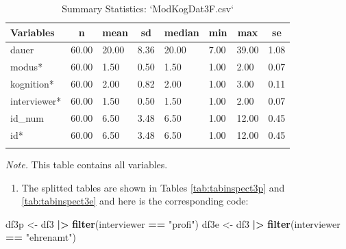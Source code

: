 \documentclass[
  doc,floatsintext]{apa6}
\newenvironment{Shaded}{\begin{snugshade}}{\end{snugshade}}
\newcommand{\FunctionTok}[1]{\textcolor[rgb]{0.13,0.29,0.53}{\textbf{#1}}}
\newcommand{\NormalTok}[1]{#1}
\newcommand{\OtherTok}[1]{\textcolor[rgb]{0.56,0.35,0.01}{#1}}
\newcommand{\SpecialCharTok}[1]{\textcolor[rgb]{0.81,0.36,0.00}{\textbf{#1}}}
\newcommand{\StringTok}[1]{\textcolor[rgb]{0.31,0.60,0.02}{#1}}
\providecommand{\tightlist}{%
  \setlength{\itemsep}{0pt}\setlength{\parskip}{0pt}}
\begin{document}
\begin{table}[tbp]

\begin{center}
\begin{threeparttable}

\caption{\label{tab:tabsumstat3correct}Summary Statistics: `ModKogDat3F.csv`}

\begin{tabular}{llllllll}
\toprule
Variables & \multicolumn{1}{c}{n} & \multicolumn{1}{c}{mean} & \multicolumn{1}{c}{sd} & \multicolumn{1}{c}{median} & \multicolumn{1}{c}{min} & \multicolumn{1}{c}{max} & \multicolumn{1}{c}{se}\\
\midrule
dauer & 60.00 & 20.00 & 8.36 & 20.00 & 7.00 & 39.00 & 1.08\\
modus* & 60.00 & 1.50 & 0.50 & 1.50 & 1.00 & 2.00 & 0.07\\
kognition* & 60.00 & 2.00 & 0.82 & 2.00 & 1.00 & 3.00 & 0.11\\
interviewer* & 60.00 & 1.50 & 0.50 & 1.50 & 1.00 & 2.00 & 0.07\\
id\_num & 60.00 & 6.50 & 3.48 & 6.50 & 1.00 & 12.00 & 0.45\\
id* & 60.00 & 6.50 & 3.48 & 6.50 & 1.00 & 12.00 & 0.45\\
\bottomrule
\addlinespace
\end{tabular}

\begin{tablenotes}[para]
\normalsize{\textit{Note.} This table contains all variables.}
\end{tablenotes}

\end{threeparttable}
\end{center}

\end{table}

\begin{enumerate}
\def\labelenumi{\arabic{enumi}.}
\setcounter{enumi}{1}
\tightlist
\item
  The splitted tables are shown in Tables \ref{tab:tabinspect3p} and \ref{tab:tabinspect3e} and here is the corresponding code:
\end{enumerate}

\begin{Shaded}
\begin{Highlighting}[]
\NormalTok{df3p }\OtherTok{\textless{}{-}}\NormalTok{ df3 }\SpecialCharTok{|\textgreater{}} 
  \FunctionTok{filter}\NormalTok{(interviewer }\SpecialCharTok{==} \StringTok{"profi"}\NormalTok{)}
\NormalTok{df3e }\OtherTok{\textless{}{-}}\NormalTok{ df3 }\SpecialCharTok{|\textgreater{}} 
  \FunctionTok{filter}\NormalTok{(interviewer }\SpecialCharTok{==} \StringTok{"ehrenamt"}\NormalTok{)}
\end{Highlighting}
\end{Shaded}
\end{document}
